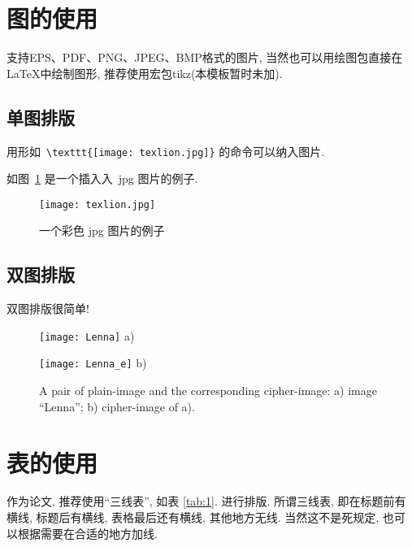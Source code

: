 \documentclass[forprint]{YAUthesis}
\begin{document}
\section{图的使用}

支持EPS、PDF、PNG、JPEG、BMP格式的图片,
当然也可以用绘图包直接在\LaTeX 中绘制图形, 推荐使用宏包tikz(本模板暂时未加). 

\subsection{单图排版}

用形如~\verb|\texttt{[image: texlion.jpg]}| 的命令可以纳入图片.

如图~\ref{fig:lion} 是一个插入入~jpg 图片的例子.

\begin{figure}[ht]
\centering
  \texttt{[image: texlion.jpg]}
  \caption{一个彩色 jpg 图片的例子}
  \label{fig:lion}
\end{figure}


\subsection{双图排版}

双图排版很简单!


\begin{figure}[ht]
\centering
\begin{minipage}[t]{\imagewidth}
\centering
\texttt{[image: Lenna]}
a)
\end{minipage} \hspace{4pt}
\begin{minipage}[t]{\imagewidth}
\centering
\texttt{[image: Lenna\_e]}
b)
\end{minipage}
\caption{A pair of plain-image and the corresponding cipher-image:
a) image ``Lenna''; b) cipher-image of a).}
\label{fig:APairPlaintext}
\end{figure}



\section{表的使用}

作为论文, 推荐使用``三线表'', 如表 \ref{tab:1}. 进行排版. 所谓三线表, 
即在标题前有横线, 标题后有横线, 表格最后还有横线, 其他地方无线. 当然这不是死规定, 
也可以根据需要在合适的地方加线. 
\end{document}
